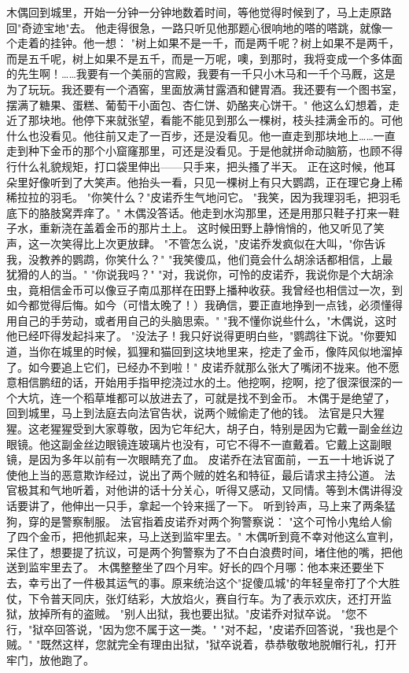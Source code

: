 \documentclass[12pt,UTF8]{ctexbook}
\begin{document}
木偶回到城里，开始一分钟一分钟地数着时间，等他觉得时候到了，马上走原路回"奇迹宝地"去。
他走得很急，一路只听见他那题心很响地的嗒的嗒跳，就像一个走着的挂钟。他一想：
"树上如果不是一千，而是两千呢？树上如果不是两千，而是五千呢，树上如果不是五千，而是一万呢，噢，到那时，我将变成一个多体面的先生啊！……我要有一个美丽的宫殿，我要有一千只小木马和一千个马厩，这是为了玩玩。我还要有一个酒窖，里面放满甘露酒和健胃酒。我还要有一个图书室，摆满了糖果、蛋糕、葡萄干小面包、杏仁饼、奶酪夹心饼干。"
他这么幻想着，走近了那块地。他停下来就张望，看能不能见到那么一棵树，枝头挂满金币的。可他什么也没看见。他往前又走了一百步，还是没看见。他一直走到那块地上……一直走到种下金币的那个小窟窿那里，可还是没看见。于是他就拼命动脑筋，也顾不得行什么礼貌规矩，打口袋里伸出——只手来，把头搔了半天。
正在这时候，他耳朵里好像听到了大笑声。他抬头一看，只见一棵树上有只大鹦鹉，正在理它身上稀稀拉拉的羽毛。
"你笑什么？"皮诺乔生气地问它。
"我笑，因为我理羽毛，把羽毛底下的胳肢窝弄痒了。"
木偶没答话。他走到水沟那里，还是用那只鞋子打来一鞋子水，重新浇在盖着金币的那片土上。
这时候田野上静悄悄的，他又听见了笑声，这一次笑得比上次更放肆。
"不管怎么说，"皮诺乔发疯似在大叫，"你告诉我，没教养的鹦鹉，你笑什么？"
"我笑傻瓜，他们竟会什么胡涂话都相信，上最犹猾的人的当。"
"你说我吗？"
"对，我说你，可怜的皮诺乔，我说你是个大胡涂虫，竟相信金币可以像豆子南瓜那样在田野上播种收获。我曾经也相信过一次，到如今都觉得后悔。如今（可惜太晚了！）我确信，要正直地挣到一点钱，必须懂得用自己的手劳动，或者用自己的头脑思索。"
"我不懂你说些什么，"木偶说，这时他已经吓得发起抖来了。
"没法子！我只好说得更明白些，"鹦鹉往下说。"你要知道，当你在城里的时候，狐狸和猫回到这块地里来，挖走了金币，像阵风似地溜掉了。如今要追上它们，已经办不到啦！"
皮诺乔就那么张大了嘴闭不拢来。他不愿意相信鹏纽的话，开始用手指甲挖浇过水的土。他挖啊，挖啊，挖了很深很深的一个大坑，连一个稻草堆都可以放进去了，可就是找不到金币。
木偶于是绝望了，回到城里，马上到法庭去向法官告状，说两个贼偷走了他的钱。
法官是只大猩猩。这老猩猩受到大家尊敬，因为它年纪大，胡子白，特别是因为它戴一副金丝边眼镜。他这副金丝边眼镜连玻璃片也没有，可它不得不一直戴着。它戴上这副眼镜，是因为多年以前有一次眼睛充了血。
皮诺乔在法官面前，一五一十地诉说了使他上当的恶意欺诈经过，说出了两个贼的姓名和特征，最后请求主持公道。
法官极其和气地听着，对他讲的话十分关心，听得又感动，又同情。等到木偶讲得没话要讲了，他伸出一只手，拿起一个铃来摇了一下。
听到铃声，马上来了两条猛狗，穿的是警察制服。
法官指着皮诺乔对两个狗警察说：
"这个可怜小鬼给人偷了四个金币，把他抓起来，马上送到监牢里去。"
木偶听到竟不幸对他这么宣判，呆住了，想要提了抗议，可是两个狗警察为了不白白浪费时间，堵住他的嘴，把他送到监牢里去了。
木偶整整坐了四个月牢。好长的四个月哪：他本来还要坐下去，幸亏出了一件极其运气的事。原来统治这个"捉傻瓜城"的年轻皇帝打了个大胜仗，下令普天同庆，张灯结彩，大放焰火，赛自行车。为了表示欢庆，还打开监狱，放掉所有的盗贼。
"别人出狱，我也要出狱。"皮诺乔对狱卒说。
"您不行，"狱卒回答说，"因为您不属于这一类。"
"对不起，"皮诺乔回答说，"我也是个贼。"
"既然这样，您就完全有理由出狱，"狱卒说着，恭恭敬敬地脱帽行礼，打开牢门，放他跑了。
\end{document}

